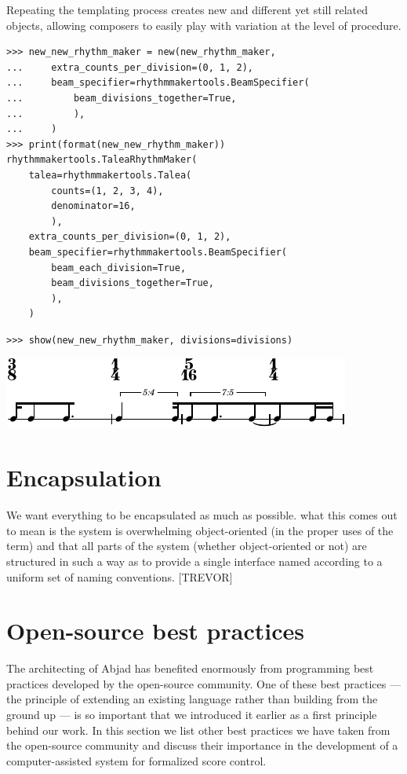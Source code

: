 \documentclass{article}
\begin{document}
Repeating the templating process creates new and different yet still related
objects, allowing composers to easily play with variation at the level of
procedure.

\begin{lstlisting}
>>> new_new_rhythm_maker = new(new_rhythm_maker,
...     extra_counts_per_division=(0, 1, 2),
...     beam_specifier=rhythmmakertools.BeamSpecifier(
...         beam_divisions_together=True,
...         ),
...     )
>>> print(format(new_new_rhythm_maker))
rhythmmakertools.TaleaRhythmMaker(
    talea=rhythmmakertools.Talea(
        counts=(1, 2, 3, 4),
        denominator=16,
        ),
    extra_counts_per_division=(0, 1, 2),
    beam_specifier=rhythmmakertools.BeamSpecifier(
        beam_each_division=True,
        beam_divisions_together=True,
        ),
    )
\end{lstlisting}


\begin{lstlisting}
>>> show(new_new_rhythm_maker, divisions=divisions)
\end{lstlisting}

\noindent\includegraphics[scale=1.0]{images/abjad-14.pdf}


\section{Encapsulation} \label{sec:encapsulation}

We want everything to be encapsulated as much as possible. what this comes out
to mean is the system is overwhelming object-oriented (in the proper uses of
the term) and that all parts of the system (whether object-oriented or not) are
structured in such a way as to provide a single interface named according to a
uniform set of naming conventions. [TREVOR]

\section{Open-source best practices} \label{sec:open-source}

The architecting of Abjad has benefited enormously from programming best practices developed by the open-source community. One of these best practices --- the principle of extending an existing language rather than building from the ground up --- is so important that we introduced it earlier as a first principle behind our work. In this section we list other best practices we have taken from the open-source community and discuss their importance in the development of a computer-assisted system for formalized score control.
\end{document}
